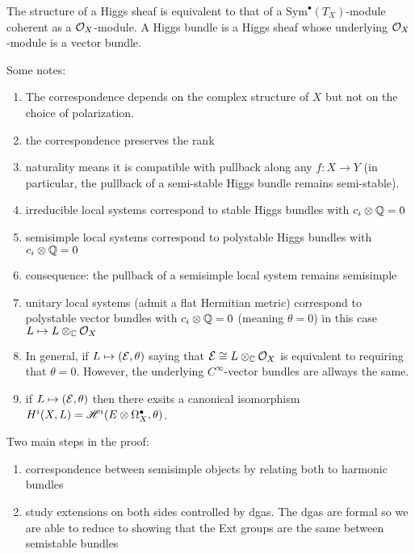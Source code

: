 \documentclass[12pt]{article}
\begin{document}
\begin{rmk}
The structure of a Higgs sheaf is equivalent to that of a $\mathrm{Sym}^\bullet(T_X)$-module coherent as a $\mathcal{O}_{X}$-module. A Higgs bundle is a Higgs sheaf whose underlying $\mathcal{O}_{X}$-module is a vector bundle.
\end{rmk}

Some notes:
\begin{enumerate}
\item The correspondence depends on the complex structure of $X$ but not on the choice of polarization. 
\item the correspondence preserves the rank
\item naturality means it is compatible with pullback along any $f : X \to Y$ (in particular, the pullback of a semi-stable Higgs bundle remains semi-stable).
\item irreducible local systems correspond to stable Higgs bundles with $c_i \otimes \mathbb{Q} = 0$
\item semisimple local systems correspond to polystable Higgs bundles with $c_i \otimes \mathbb{Q} = 0$
\item consequence: the pullback of a semisimple local system remains semisimple
\item unitary local systems (admit a flat Hermitian metric) correspond to polystable vector bundles with $c_i \otimes \mathbb{Q} = 0$ (meaning $\theta = 0$) in this case $L \mapsto L \otimes_{\mathbb{C}} \mathcal{O}_{X}$
\item In general, if $L \mapsto (\mathcal{E}, \theta)$ saying that $\mathcal{E} \cong L \otimes_{\mathbb{C}} \mathcal{O}_{X}$ is equivalent to requiring that $\theta = 0$. However, the underlying $C^{\infty}$-vector bundles are allways the same. 
\item if $L \mapsto (\mathcal{E}, \theta)$ then there exsits a canonical isomorphism $H^i(X, L) = \mathscr{H}^i(E \otimes \Omega^\bullet_X, \theta)$.
\end{enumerate}

Two main steps in the proof:
\begin{enumerate}
\item correspondence between semisimple objects by relating both to harmonic bundles
\item study extensions on both sides controlled by dgas. The dgas are formal so we are able to reduce to showing that the Ext groups are the same between semistable bundles
\end{enumerate}

\renewcommand{\gr}{\mathrm{gr}}
\newcommand{\Dol}{\mathrm{Dol}}
\end{document}
